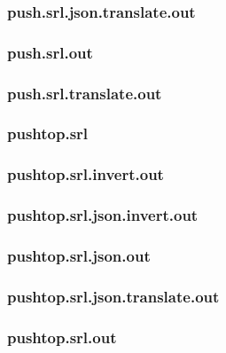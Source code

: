 \subsubsection{push.srl.json.translate.out}
\label{app:push_srl.json.translate.out}

\subsubsection{push.srl.out}
\label{app:push_srl.out}

\subsubsection{push.srl.translate.out}
\label{app:push_srl.translate.out}

\subsubsection{pushtop.srl}
\label{app:pushtop_srl}

\subsubsection{pushtop.srl.invert.out}
\label{app:pushtop_srl.invert.out}

\subsubsection{pushtop.srl.json.invert.out}
\label{app:pushtop_srl.json.invert.out}

\subsubsection{pushtop.srl.json.out}
\label{app:pushtop_srl.json.out}

\subsubsection{pushtop.srl.json.translate.out}
\label{app:pushtop_srl.json.translate.out}

\subsubsection{pushtop.srl.out}
\label{app:pushtop_srl.out}


